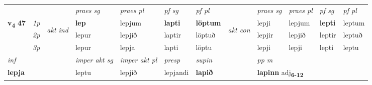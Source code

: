 \begin{longtable}[l]{X>{\footnotesize\itshape}llXXXXlXXXX}
 & &   & \textit{praes sg}  & \textit{praes pl}    & \textit{ pf sg} & \textit{pf pl} & & \textit{praes sg}  & \textit{praes pl}    & \textit{pf sg} & \textit{pf pl }  \\ \cmidrule{4-7} \cmidrule{9-12}
 \multirow{2}{*}{{{\textbf{v{\textsubscript{4}}} \Large{\textbf{47}}}}}  & 1p & \multirow{3}{*}{\begin{turn}{90}\textit{akt ind}\end{turn}} & \textbf{lep} & lepjum & \textbf{lapti} & \textbf{löptum} & \multirow{3}{*}{\begin{turn}{90}\textit{akt con}\end{turn}} &lepji & lepjum & \textbf{lepti} & leptum\\*
 & 2p &  &  lepur  & lepjið & laptir & löptuð & & lepjir & lepjið & leptir & leptuð \\*
 & 3p &  & lepur & lepja & lapti & löptu & & lepji & lepji& lepti & leptu \\*
\cmidrule{4-7} \cmidrule{9-12}

   {\textit{inf}} & &  & \textit{imper akt sg} & \textit{imper akt pl}   & \textit{presp} & \textit{supin}  && \textit{pp m} \\*
  {\textbf{lepja}} & && leptu  & lepjið   & lepjandi &  \textbf{lapið}  && \multicolumn{2}{l}{\textbf{lapinn} adj\textbf{\textsubscript{6-12}}} \\*

\midrule


\end{longtable}
